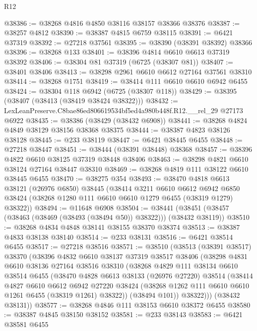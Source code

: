 \begin{lexlean}{R12}
\begin{coremodule}
@38386 := @38268 @4816 @4850 @38116 @38157 @38366 @38376
@38387 := @38257 @4812
@38390 := @38387 @4815 @6759 @38115
@38391 := @6421 @37319
@38392 := @27218 @37561
@38395 := @38390 (@38391 @38392) @38366
@38396 := @38268 @133
@38401 := @38396 @4814 @6610 @6613 @37319 @38392
@38406 := @38304 @81 @37319 (@6725 (@38307 @81))
@38407 := @38401 @38406
@38413 := @38298 @2961 @6610 @6612 @27164 @37561 @38310
@38414 := @38268 @1751
@38419 := @38414 @111 @6610 @6610 @6942 @6455
@38424 := @38304 @118 @6942 (@6725 (@38307 @118))
@38429 := @38395 (@38407 (@38413 (@38419 @38424 @38322)))
@38432 := LexLeanPreserve.C8bae86ed806619534bf5ed4a980b448f.R12.__rel_29 @27173 @6922
@38435 := @38386 (@38429 (@38432 @6908))
@38441 := @38268 @4824 @4849 @38129 @38156 @38368 @38375
@38444 := @38387 @4823 @38126 @38128
@38445 := @233 @38119
@38447 := @6421 @38445 @6455
@38448 := @27218 @38447
@38451 := @38444 (@38391 @38448) @38368
@38457 := @38396 @4822 @6610 @38125 @37319 @38448 @38406
@38463 := @38298 @4821 @6610 @38124 @27164 @38447 @38310
@38469 := @38268 @4819 @111 @38122 @6610 @38445 @6455
@38470 := @38275 @354
@38493 := @38470
    @4818
    @6613
    @38121
    (@26976 @6850)
    @38445
    (@38414
      @3211
      @6610
      @6612
      @6942
      @6850
      @38424
      (@38268 @1280 @111 @6610 @6610 @1279 @6455 (@38319 @1279) @38322))
@38494 := @11648 @6908
@38504 := @38441 (@38451 (@38457 (@38463 (@38469 (@38493 (@38494 @50)) @38322))) (@38432 @38119))
@38510 := @38268 @4834 @4848 @38141 @38155 @38370 @38374
@38513 := @38387 @4833 @38138 @38140
@38514 := @233 @38131
@38516 := @6421 @38514 @6455
@38517 := @27218 @38516
@38571 := @38510
    (@38513
      (@38391 @38517)
      @38370
      (@38396
        @4832
        @6610
        @38137
        @37319
        @38517
        @38406
        (@38298
          @4831
          @6610
          @38136
          @27164
          @38516
          @38310
          (@38268
            @4829
            @111
            @38134
            @6610
            @38514
            @6455
            (@38470
              @4828
              @6613
              @38133
              (@26976 @27220)
              @38514
              (@38414
                @4827
                @6610
                @6612
                @6942
                @27220
                @38424
                (@38268 @1262 @111 @6610 @6610 @1261 @6455 (@38319 @1261) @38322))
              (@38494 @101))
            @38322)))
      (@38432 @38131))
@38577 := @38268 @4846 @111 @38153 @6610 @38372 @6455
@38580 := @38387 @4845 @38150 @38152
@38581 := @233 @38143
@38583 := @6421 @38581 @6455

\end{coremodule}
\end{lexlean}
